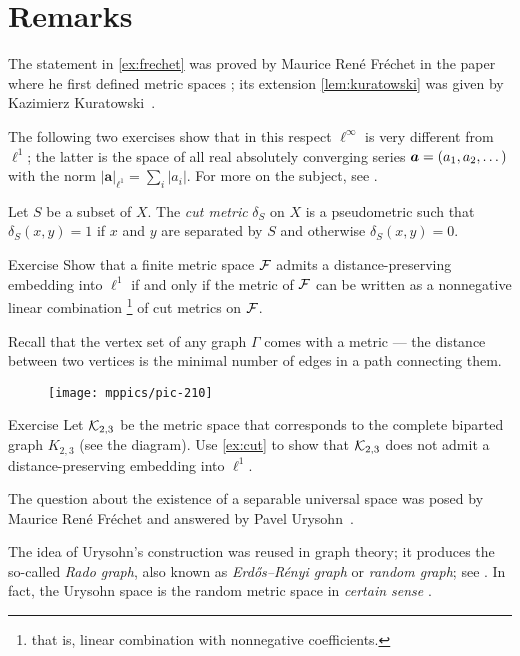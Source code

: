 \section{Remarks}

The statement in \ref{ex:frechet} was proved by Maurice René Fréchet in the paper where he first defined metric spaces \cite{frechet};
its extension \ref{lem:kuratowski} was given by Kazimierz Kuratowski~\cite{kuratowski}.

The following two exercises show that in this respect $\ell^\infty$ is very different from $\ell^1$;
the latter is the space of all real absolutely converging series $\bm{a}\z=(a_1,a_2,\dots)$ with the norm $|\bm{a}|_{\ell^1}=\sum_i|a_i|$.
For more on the subject, see \cite{deza-laurent}.

Let $S$ be a subset of $X$.
The \emph{cut metric} $\delta_S$ on $X$ is a pseudometric such that $\delta_S(x, y) = 1$ if $x$ and $y$ are separated
by $S$ and otherwise $\delta_S(x, y) = 0$.


\begin{thm}{Exercise}\label{ex:cut}
Show that a finite metric space $\mathcal{F}$ admits a distance-preserving embedding into $\ell^1$ if and only if the metric of $\mathcal{F}$ can be written as a nonnegative linear combination%
\footnote{that is, linear combination with nonnegative coefficients.} of cut metrics on $\mathcal{F}$.
\end{thm}

Recall that the vertex set of any graph $\Gamma$ comes with a metric ---
the distance between two vertices is the minimal number of edges in a path connecting them.

\begin{wrapfigure}{r}{15mm}
\vskip-4mm
\centering
\texttt{[image: mppics/pic-210]}
\end{wrapfigure}

\begin{thm}{Exercise}\label{ex:K23}
Let $\mathcal{K}_{2,3}$ be the metric space that corresponds to the complete biparted graph $K_{2,3}$ (see the diagram).
Use \ref{ex:cut} to show that $\mathcal{K}_{2,3}$ does not admit a distance-preserving embedding into $\ell^1$.
\end{thm}

The question about the existence of a separable universal space was posed by Maurice René Fréchet and answered by
Pavel Urysohn~\cite{urysohn}.

The idea of Urysohn's construction was reused in graph theory; it produces the so-called \emph{Rado graph},
also known as {}\emph{Erd\H{o}s--Rényi graph} or \emph{random graph}; see \cite{cameron}.
In fact, the Urysohn space is the random metric space in \textit{certain sense} \cite{vershik}.

